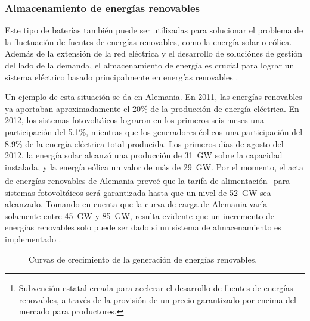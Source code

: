 \subsubsection{Almacenamiento de energías renovables}

Este tipo de baterías también puede ser utilizadas para solucionar el problema de la fluctuación de fuentes de energías renovables, como la energía solar o eólica. Además de la extensión de la red eléctrica y el desarrollo de soluciónes de gestión del lado de la demanda, el almacenamiento de energía es crucial para lograr un sistema eléctrico basado principalmente en energías renovables \cite{storage}. 

Un ejemplo de esta situación se da en Alemania. En 2011, las energías renovables ya aportaban aproximadamente el 20\% de la producción de energía eléctrica. En 2012, los sistemas fotovoltáicos lograron en los primeros seis meses una participación del 5.1\%, mientras que los generadores éolicos una participación del 8.9\% de la energía eléctrica total producida. Los primeros días de agosto del 2012, la energía solar alcanzó una producción de \SI{31}{\giga\watt} sobre la capacidad instalada, y la energía eólica un valor de más de \SI{29}{\giga\watt}. Por el momento, el acta de energías renovables de Alemania preveé que la tarifa de alimentación\footnote{Subvención estatal creada para acelerar el desarrollo de fuentes de energías renovables, a través de la provisión de un precio garantizado por encima del mercado para productores.} para sistemas fotovoltáicos será garantizada hasta que un nivel de \SI{52}{\giga\watt} sea alcanzado. Tomando en cuenta que la curva de carga de Alemania varía solamente entre \SI{45}{\giga\watt} y \SI{85}{\giga\watt}, resulta evidente que un incremento de energías renovables solo puede ser dado si un sistema de almacenamiento es implementado \cite{alemania}.

\begin{figure}[hbt!]
  \centering
  \hspace{3.5mm}
  \caption{Curvas de crecimiento de la generación de energías renovables.}
  \label{generacion-alemana}
\end{figure}


